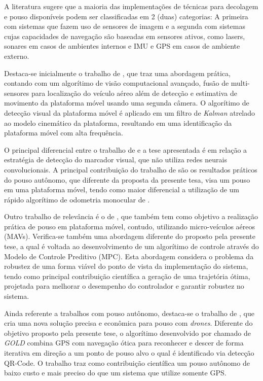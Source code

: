     A literatura sugere que a maioria das implementações de técnicas para decolagem e pouso disponíveis podem ser classificadas em 2 (duas) categorias: A primeira com sistemas que fazem uso de sensores de imagem e a segunda com sistemas cujas capacidades de navegação são baseadas em sensores ativos, como lasers, sonares em casos de ambientes internos e IMU e GPS em casos de ambiente externo.
    
    Destaca-se inicialmente o trabalho de \citet{Falanga2017}, que traz uma abordagem prática, contando com um algorítimo de visão computacional avançado, fusão de multi-sensores para localização do veículo aéreo além de detecção e estimativa de movimento da plataforma móvel usando uma segunda câmera. O algorítimo de detecção visual da plataforma móvel é aplicado em um filtro de \textit{Kalman} atrelado ao modelo cinemático da plataforma, resultando em uma identificação da plataforma móvel com alta frequência.
    
    O principal diferencial entre o trabalho de \citet{Falanga2017} e a tese apresentada é em relação a estratégia de detecção do marcador visual, que não utiliza redes neurais convolucionais. A principal contribuição do trabalho de \citet{Falanga2017} são os resultados práticos do pouso autônomo, que diferente da proposta da presente tesa, visa um pouso em uma plataforma móvel, tendo como maior diferencial a utilização de um rápido algorítimo de odometria monocular de \cite{Forster2014}.
    
    Outro trabalho de relevância é o de \citet{Gilberto2016}, que também tem como objetivo a realização prática de pouso em plataforma móvel, contudo, utilizando micro-veículos aéreos (MAVs). Verifica-se também uma abordagem diferente do proposto pela presente tese, a qual é voltada ao desenvolvimento de um algorítimo de controle através do Modelo de Controle Preditivo (MPC). Esta abordagem considera o problema da robustez de uma forma viável do ponto de vista da implementação do sistema, tendo como principal contribuição científica a geração de uma trajetória ótima, projetada para melhorar o desempenho do controlador e garantir robustez no sistema.
    
    Ainda referente a trabalhos com pouso autônomo, destaca-se o trabalho de \citet{Maiman2017}, que cria uma nova solução precisa e econômica para pouso com \textit{drones}. Diferente do objetivo proposto pela presente tese, o algorítimo desenvolvido por \citet{Maiman2017} chamado de \textit{GOLD} combina GPS com navegação ótica para reconhecer e descer de forma iterativa em direção a um ponto de pouso alvo o qual é identificado via detecção QR-Code. O trabalho traz como contribuição científica um pouso autônomo de baixo custo e mais preciso do que um sistema que utilize somente GPS.
    
